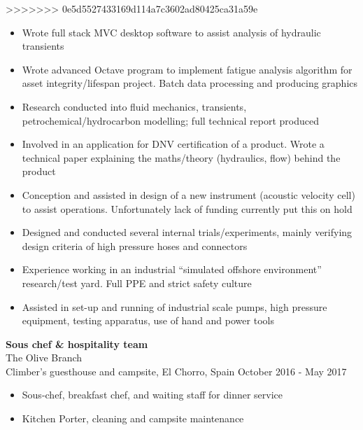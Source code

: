 \documentclass[margin, line, 10pt]{res} %
\begin{document}
\begin{resume}
>>>>>>> 0e5d5527433169d114a7c3602ad80425ca31a59e
\begin{itemize}

\item Wrote full stack MVC desktop software to assist analysis of hydraulic transients

\item Wrote advanced Octave program to implement fatigue analysis algorithm for asset integrity/lifespan project. Batch data processing and producing graphics

\item Research conducted into fluid mechanics, transients, petrochemical/hydrocarbon modelling; full technical report produced

\item Involved in an application for DNV certification of a product. Wrote a technical paper explaining the maths/theory (hydraulics, flow) behind the product

\item Conception and assisted in design of a new instrument (acoustic velocity cell) to assist operations. Unfortunately lack of funding currently put this on hold

\item Designed and conducted several internal trials/experiments, mainly verifying design criteria of high pressure hoses and connectors 

\item Experience working in an industrial ``simulated offshore environment'' research/test yard. Full PPE and strict safety culture 

\item Assisted in set-up and running of industrial scale pumps, high pressure equipment, testing apparatus, use of hand and power tools

\end{itemize}

\textbf{Sous chef \& hospitality team} \\
The Olive Branch\\
Climber's guesthouse and campsite, El Chorro, Spain \hfill October 2016 - May 2017\\
\begin{itemize} \itemsep -2pt %
\item Sous-chef, breakfast chef, and waiting staff for dinner service 
\item Kitchen Porter, cleaning and campsite maintenance
\end{itemize}


\end{resume}
\end{document}
